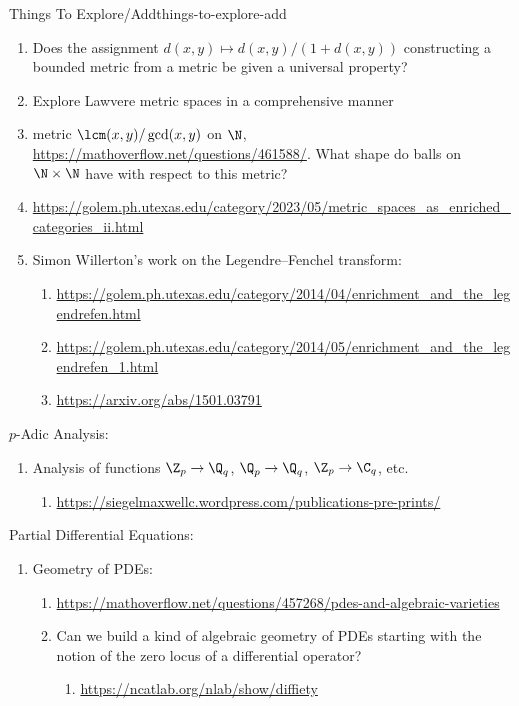 \begin{remark}{Things To Explore/Add}{things-to-explore-add}
\begin{enumerate}
        \item Does the assignment $d(x,y)\mapsto d(x,y)/(1+d(x,y))$ constructing a bounded metric from a metric be given a universal property?
        \item Explore Lawvere metric spaces in a comprehensive manner
        \item metric $\lcm(x,y)/\gcd(x,y)$ on $\N$, \url{https://mathoverflow.net/questions/461588/}. What shape do balls on $\N\times\N$ have with respect to this metric?
        \item \url{https://golem.ph.utexas.edu/category/2023/05/metric_spaces_as_enriched_categories_ii.html}
        \item Simon Willerton's work on the Legendre--Fenchel transform:
            \begin{enumerate}
                \item \url{https://golem.ph.utexas.edu/category/2014/04/enrichment_and_the_legendrefen.html}
                \item \url{https://golem.ph.utexas.edu/category/2014/05/enrichment_and_the_legendrefen_1.html}
                \item \url{https://arxiv.org/abs/1501.03791}
            \end{enumerate}
    \end{enumerate}
    $p$-Adic Analysis:
    \begin{enumerate}
        \item Analysis of functions $\Z_{p}\to\Q_{q}$, $\Q_{p}\to\Q_{q}$, $\Z_{p}\to\C_{q}$, etc.
            \begin{enumerate}
                \item \url{https://siegelmaxwellc.wordpress.com/publications-pre-prints/}
            \end{enumerate}
    \end{enumerate}
    Partial Differential Equations:
    \begin{enumerate}
        \item Geometry of PDEs:
            \begin{enumerate}
                \item \url{https://mathoverflow.net/questions/457268/pdes-and-algebraic-varieties}
                \item Can we build a kind of algebraic geometry of PDEs starting with the notion of the zero locus of a differential operator?
                    \begin{enumerate}
                        \item \url{https://ncatlab.org/nlab/show/diffiety}

\end{enumerate}
\end{enumerate}
\end{enumerate}
\end{remark}

